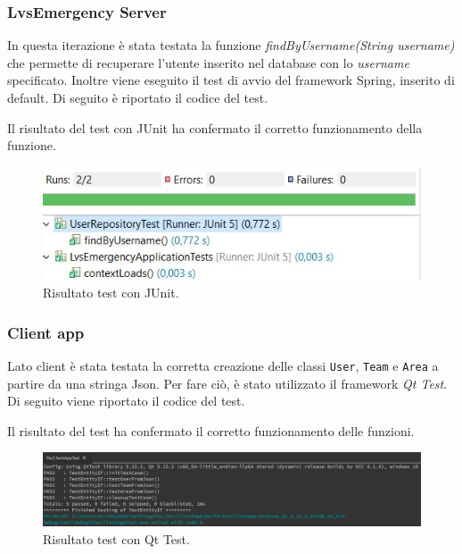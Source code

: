 \subsubsection{LvsEmergency Server}
In questa iterazione è stata testata la funzione \textit{findByUsername(String username)} che permette di recuperare l'utente inserito nel database con lo \textit{username} specificato. Inoltre viene eseguito il test di avvio del framework Spring, inserito di default. Di seguito è riportato il codice del test.



Il risultato del test con JUnit ha confermato il corretto funzionamento della funzione.

\begin{figure}[h!]
	\centering
	\includegraphics[width=1\linewidth]{./Iterazione 2/ImageFiles/TestJUnit}
	\caption{Risultato test con JUnit.}
	\label{fig:RisultatiTestJunitIT2}
\end{figure}

\subsubsection{Client app}
Lato client è stata testata la corretta creazione delle classi \texttt{User}, \texttt{Team} e \texttt{Area} a partire da una stringa Json. Per fare ciò, è stato utilizzato il framework \textit{Qt Test}. Di seguito viene riportato il codice del test.
 


Il risultato del test ha confermato il corretto funzionamento delle funzioni.

\begin{figure}[h!]
	\centering
	\includegraphics[width=1\linewidth]{./Iterazione 2/ImageFiles/TestQtTest}
	\caption{Risultato test con Qt Test.}
	\label{fig:RisultatiTestQTestIT2}
\end{figure}

